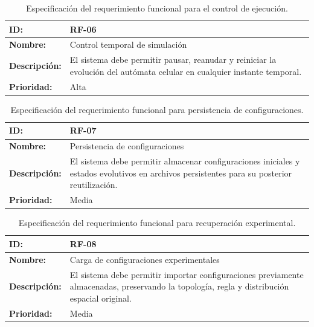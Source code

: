 \begin{table}[H]
\centering
\begin{tabular}{|l|p{10cm}|}
\hline
\textbf{ID:} & \textbf{RF-06} \\ \hline
\textbf{Nombre:} & Control temporal de simulación \\ \hline
\textbf{Descripción:} & El sistema debe permitir pausar, reanudar y reiniciar la evolución del autómata celular en cualquier instante temporal. \\ \hline
\textbf{Prioridad:} & Alta \\ \hline
\end{tabular}
\caption{Especificación del requerimiento funcional para el control de ejecución.}
\label{tab:rf06}
\end{table}

\begin{table}[H]
\centering
\begin{tabular}{|l|p{10cm}|}
\hline
\textbf{ID:} & \textbf{RF-07} \\ \hline
\textbf{Nombre:} & Persistencia de configuraciones \\ \hline
\textbf{Descripción:} & El sistema debe permitir almacenar configuraciones iniciales y estados evolutivos en archivos persistentes para su posterior reutilización. \\ \hline
\textbf{Prioridad:} & Media \\ \hline
\end{tabular}
\caption{Especificación del requerimiento funcional para persistencia de configuraciones.}
\label{tab:rf07}
\end{table}

\begin{table}[H]
\centering
\begin{tabular}{|l|p{10cm}|}
\hline
\textbf{ID:} & \textbf{RF-08} \\ \hline
\textbf{Nombre:} & Carga de configuraciones experimentales \\ \hline
\textbf{Descripción:} & El sistema debe permitir importar configuraciones previamente almacenadas, preservando la topología, regla y distribución espacial original. \\ \hline
\textbf{Prioridad:} & Media \\ \hline
\end{tabular}
\caption{Especificación del requerimiento funcional para recuperación experimental.}
\label{tab:rf08}
\end{table}

